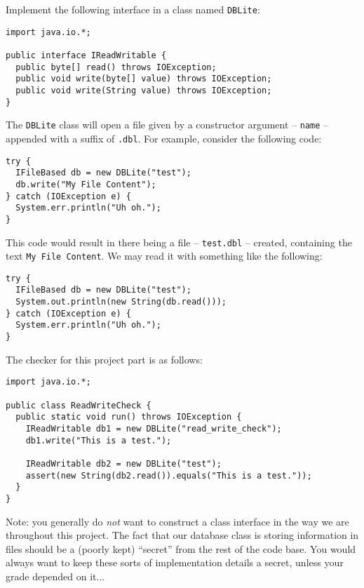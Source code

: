 \documentclass{article}
\begin{document}
Implement the following interface in a class named \texttt{DBLite}:

\clearpage

\begin{verbatim}
import java.io.*;

public interface IReadWritable {
  public byte[] read() throws IOException;
  public void write(byte[] value) throws IOException;
  public void write(String value) throws IOException;
}
\end{verbatim}

The \texttt{DBLite} class will open a file given by a constructor argument --
\texttt{name} -- appended with a suffix of \texttt{.dbl}.  For example,
consider the following code:

\begin{verbatim}
try {
  IFileBased db = new DBLite("test");
  db.write("My File Content");
} catch (IOException e) {
  System.err.println("Uh oh.");
}
\end{verbatim}

This code would result in there being a file -- \texttt{test.dbl} -- created,
containing the text \texttt{My File Content}.  We may read it with something
like the following:

\begin{verbatim}
try {
  IFileBased db = new DBLite("test");
  System.out.println(new String(db.read()));
} catch (IOException e) {
  System.err.println("Uh oh.");
}
\end{verbatim}

The checker for this project part is as follows:

\begin{verbatim}
import java.io.*;

public class ReadWriteCheck {
  public static void run() throws IOException {
    IReadWritable db1 = new DBLite("read_write_check");
    db1.write("This is a test.");

    IReadWritable db2 = new DBLite("test");
    assert(new String(db2.read()).equals("This is a test."));
  }
}
\end{verbatim}

Note: you generally do {\em not} want to construct a class interface in the way
we are throughout this project.  The fact that our database class is storing
information in files should be a (poorly kept) ``secret'' from the rest of the
code base.  You would always want to keep these sorts of implementation details
a secret, unless your grade depended on it...
\end{document}
